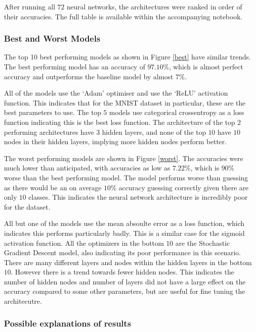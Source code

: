 \documentclass[a4paper,11pt]{article}
\theoremstyle{plain} %
\theoremstyle{definition} %
\theoremstyle{remark} %
\begin{document}
After running all $72$ neural networks, the architectures were ranked in order of their accuracies. The full table is available within the accompanying notebook.

\subsubsection{Best and Worst Models}

The top 10 best performing models as shown in Figure \cref{best} have similar trends. The best performing model has an accuracy of $97.10\%$, which is almost perfect accuracy and outperforms the baseline model by almost $7\%$.

All of the models use the `Adam' optimiser and use the `ReLU' activation function. This indicates that for the MNIST dataset in particular, these are the best parameters to use. The top $5$ models use categorical crossentropy as a loss function indicating this is the best loss function. The architecture of the top $2$ performing architectures have $3$ hidden layers, and none of the top $10$ have $10$ nodes in their hidden layers, implying more hidden nodes perform better.

The worst performing models are shown in Figure \cref{worst}. The accuracies were much lower than anticipated, with accuracies as low as $7.22\%$, which is $90\%$ worse than the best performing model. The model performs worse than guessing as there would be an on average $10\%$ accuracy guessing correctly given there are only $10$ classes. This indicates the neural network architecture is incredibly poor for the dataset. 


All but one of the models use the mean absoulte error as a loss function, which indicates this performs particularly badly. This is a similar case for the sigmoid activation function. All the optimizers in the bottom $10$ are the Stochastic Gradient Descent model, also indicating its poor performance in this scenario. There are many different layers and nodes within the hidden layers in the bottom $10$. However there is a trend towards fewer hidden nodes. This indicates the number of hidden nodes and number of layers did not have a large effect on the accuracy compared to some other parameters, but are useful for fine tuning the architecutre.

\subsubsection{Possible explanations of results}
\end{document}
